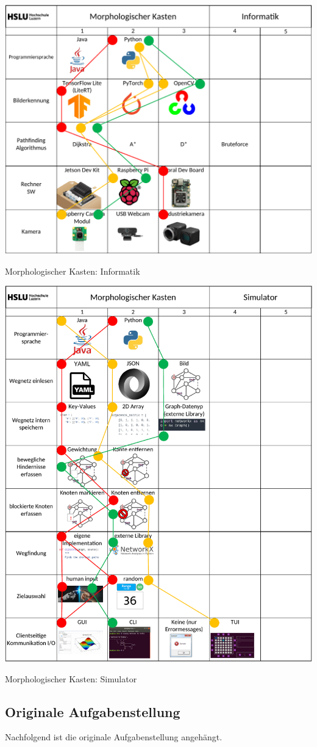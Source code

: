 \newpage
\begin{table}[H]
\centering
\includegraphics[width=\textwidth]{assets/MK_Informatik.pdf}
\caption{Morphologischer Kasten: Informatik}
\label{table:MK-Informatik}
\end{table}
\newpage
\begin{table}[H]
\centering
\includegraphics[width=\textwidth]{assets/MK_Simulator.pdf}
\caption{Morphologischer Kasten: Simulator}
\label{table:MK-Simulator}
\end{table}
\newpage

\subsection{Originale Aufgabenstellung}\label{aufgabenstellung}

Nachfolgend ist die originale Aufgabenstellung angehängt.


